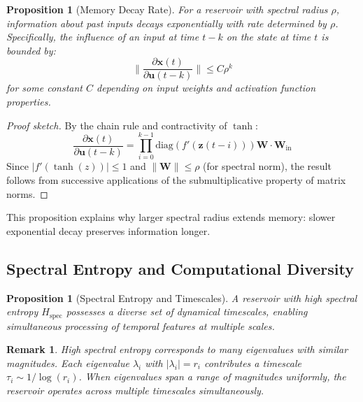 \documentclass{article}
\newtheorem{proposition}[theorem]{Proposition}
\newtheorem{remark}{Remark}
\begin{document}
\begin{proposition}[Memory Decay Rate]
\label{prop:memory}
For a reservoir with spectral radius $\rho$, information about past inputs decays exponentially with rate determined by $\rho$. Specifically, the influence of an input at time $t-k$ on the state at time $t$ is bounded by:
\begin{equation}
\|\frac{\partial \mathbf{x}(t)}{\partial \mathbf{u}(t-k)}\| \leq C \rho^k
\end{equation}
for some constant $C$ depending on input weights and activation function properties.
\end{proposition}

\begin{proof}[Proof sketch]
By the chain rule and contractivity of $\tanh$:
\begin{equation}
\frac{\partial \mathbf{x}(t)}{\partial \mathbf{u}(t-k)} = \prod_{i=0}^{k-1} \text{diag}(f'(\mathbf{z}(t-i))) \mathbf{W} \cdot \mathbf{W}_{\text{in}}
\end{equation}
Since $|f'(\tanh(z))| \leq 1$ and $\|\mathbf{W}\| \leq \rho$ (for spectral norm), the result follows from successive applications of the submultiplicative property of matrix norms.
\end{proof}

This proposition explains why larger spectral radius extends memory: slower exponential decay preserves information longer.

\subsection{Spectral Entropy and Computational Diversity}

\begin{proposition}[Spectral Entropy and Timescales]
\label{prop:entropy}
A reservoir with high spectral entropy $H_{\text{spec}}$ possesses a diverse set of dynamical timescales, enabling simultaneous processing of temporal features at multiple scales.
\end{proposition}

\begin{remark}
High spectral entropy corresponds to many eigenvalues with similar magnitudes. Each eigenvalue $\lambda_i$ with $|\lambda_i| = r_i$ contributes a timescale $\tau_i \sim 1/\log(r_i)$. When eigenvalues span a range of magnitudes uniformly, the reservoir operates across multiple timescales simultaneously.
\end{remark}
\end{document}
